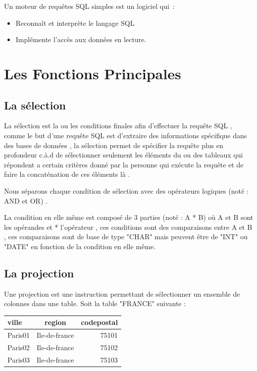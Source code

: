 \documentclass[oneside,13pt,a4paper]{report}
\begin{document}
        Un moteur de requêtes SQL simples est un logiciel qui :
        \begin{itemize}
            \item Reconnaît et interprète le langage SQL
            \item Implémente l’accès aux données en lecture.
        \end{itemize}

    \section{Les Fonctions Principales}

        \subsection{La sélection}

            La sélection est la ou les conditions finales afin d'effectuer la requête SQL , comme le but d'une requête SQL est d'extraire des informations spécifique dans des bases de données , la sélection permet de spécifier la requête plus en profondeur c.à.d de sélectionner seulement les éléments du ou des tableaux qui répondent a certain critères donné par la personne qui exécute la requête et de faire la concaténation de ces éléments là .

    	    Nous séparons chaque condition de sélection avec des opérateurs logiques (noté : AND et OR) .

	        La condition en elle même est composé de 3 parties (noté : A * B) où A et B sont les opérandes et * l'opérateur , ces conditions sont des comparaisons entre A et B , ces comparaisons sont de base de type "CHAR" mais peuvent être de "INT" ou "DATE" en fonction de la condition en elle même.

        \subsection{La projection}

         Une projection est une instruction permettant de sélectionner un ensemble de colonnes dans une table.
         Soit la table "FRANCE" suivante :



         \begin{tabular}{|l|c|r|}
          \hline
          ville & region & codepostal
          \\
          \hline
          Paris01 & Ile-de-france & 75101 \\
          Paris02 & Ile-de-france & 75102 \\
          Paris03 & Ile-de-france & 75103 \\
          \hline

         \end{tabular}
\end{document}
